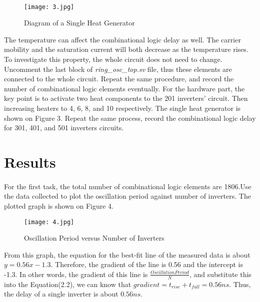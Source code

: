\documentclass[12pt]{article}
\begin{document}
    \paragraph{}
    \begin{figure}[H]
    \centering
    \texttt{[image: 3.jpg]}
    \caption{Diagram of a Single Heat Generator}
    \end{figure}
    The temperature can affect the combinational logic delay as well. The carrier mobility and the saturation current will both decrease as the temperature rises\cite{4}. To investigate this property, the whole circuit does not need to change. Uncomment the last block of \textit{ring\_osc\_top.sv} file, thus these elements are connected to the whole circuit. Repeat the same procedure, and record the number of combinational logic elements eventually. For the hardware part, the key point is to activate two heat components to the 201 inverters' circuit. Then increasing heaters to 4, 6, 8, and 10 respectively. The single heat generator is shown on Figure 3. Repeat the same process, record the combinational logic delay for 301, 401, and 501 inverters circuits.
    
    \section{Results}
    \paragraph{}
    For the first task, the total number of combinational logic elements are 1806.Use the data collected to plot the oscillation period against number of inverters. The plotted graph is shown on Figure 4.
    \begin{figure}[H]
    \centering
    \texttt{[image: 4.jpg]}
    \caption{Oscillation Period versus Number of Inverters}
    \end{figure}
    From this graph, the equation for the best-fit line of the measured data is about $y=0.56x-1.3$. Therefore, the gradient of the line is 0.56 and the intercept is -1.3. In other words, the gradient of this line is $\frac{Oscillation Period}{N}$, and substitute this into the Equation(2.2), we can know that $gradient=t_{rise}+t_{fall}=0.56ns$. Thus, the delay of a single inverter is about $0.56ns$.
\end{document}
